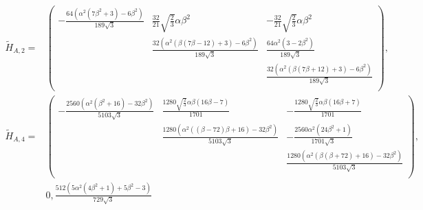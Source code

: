 \documentclass[a4paper,prb]{revtex4-1}  %
\begin{document}
{%
\begin{align} 
\tilde H_{A,2} =& 
\left(
\begin{array}{ccc}
 -\frac{64 \left(\alpha ^2 \left(7 \beta ^2+3\right)-6 \beta ^2\right)}{189 \sqrt{3}} & \frac{32}{21} \sqrt{\frac{2}{3}} \alpha  \beta ^2 & -\frac{32}{21} \sqrt{\frac{2}{3}} \alpha  \beta ^2 \\
 & \frac{32 \left(\alpha ^2 (\beta  (7 \beta -12)+3)-6 \beta ^2\right)}{189 \sqrt{3}} & \frac{64 \alpha ^2 \left(3-2 \beta ^2\right)}{189 \sqrt{3}} \\
&  & \frac{32 \left(\alpha ^2 (\beta  (7 \beta +12)+3)-6 \beta ^2\right)}{189 \sqrt{3}} \\
\end{array}
\right),\\
\tilde H_{A,4} =& 
\left(
\begin{array}{ccc}
 -\frac{2560 \left(\alpha ^2 \left(\beta ^2+16\right)-32 \beta ^2\right)}{5103 \sqrt{3}} & \frac{1280 \sqrt{\frac{2}{3}} \alpha  \beta  (16 \beta -7)}{1701} & -\frac{1280 \sqrt{\frac{2}{3}} \alpha  \beta  (16 \beta +7)}{1701} \\
 & \frac{1280 \left(\alpha ^2 ((\beta -72) \beta +16)-32 \beta ^2\right)}{5103 \sqrt{3}} & -\frac{2560 \alpha ^2 \left(24 \beta ^2+1\right)}{1701 \sqrt{3}} \\
&& \frac{1280 \left(\alpha ^2 (\beta  (\beta +72)+16)-32 \beta ^2\right)}{5103 \sqrt{3}} \\
\end{array}
\right),\\
& 0,\frac{512 \left(5 \alpha ^2 \left(4 \beta ^2+1\right)+5 \beta ^2-3\right)}{729 \sqrt{3}}
\end{align}

}
\end{document}
